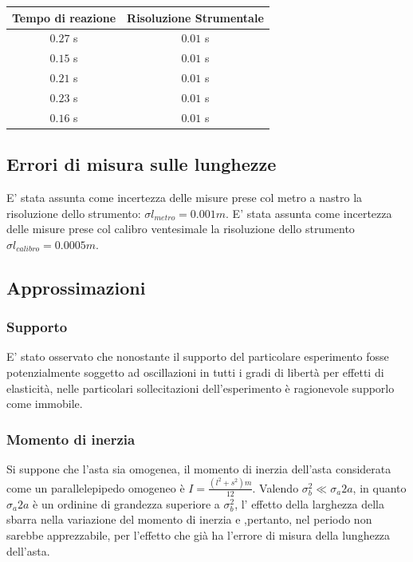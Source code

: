 \documentclass[11pt]{article}
\begin{document}
\begin{table} 
\centering
\begin{tabular}{|c|c|}
 
\hline
  Tempo di reazione & Risoluzione Strumentale \\
  \hline
  $0.27 $ s & $0.01$ s \\
  $0.15$ s & $0.01$ s \\
  $0.21$ s & $0.01$ s \\
  $0.23$ s & $0.01$ s \\
  $0.16$ s & $0.01$ s \\
  \hline

\end{tabular}
\end{table}




\subsection{Errori di misura sulle lunghezze}
E' stata assunta come incertezza delle misure prese col metro a nastro la risoluzione dello strumento: $\sigma l_{metro}=0.001 m$.
E' stata assunta come incertezza delle misure prese col calibro ventesimale la risoluzione dello strumento $\sigma l_{calibro}=0.0005 m$.
\subsection{Approssimazioni}
\subsubsection{Supporto}
E' stato osservato che nonostante il supporto del particolare esperimento fosse potenzialmente soggetto ad oscillazioni in tutti i gradi di libertà per effetti di elasticità, nelle particolari sollecitazioni dell'esperimento è ragionevole supporlo come immobile.
\subsubsection{Momento di inerzia}
Si suppone che l'asta sia omogenea, il momento di inerzia dell'asta considerata come un parallelepipedo omogeneo è $I=\frac{(l^2+s^2)m}{12}$.
Valendo  $\sigma_b ^2 \ll \sigma_a 2a$, in quanto $\sigma_a 2a$ è un ordinine di grandezza superiore a $\sigma_b^2$, l' effetto della larghezza della sbarra nella variazione del momento di inerzia e ,pertanto, nel periodo non sarebbe apprezzabile, per l'effetto che già ha l'errore di misura della lunghezza dell'asta.
\end{document}
